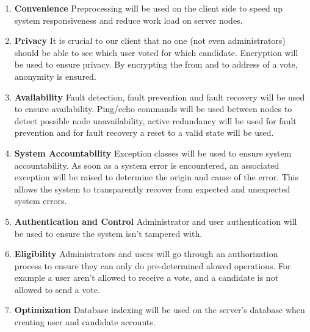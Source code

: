 \begin{enumerate}
		\item\textbf{Convenience}
		Preprocessing will be used on the client side to speed up system responsiveness and reduce work load on server nodes.
		
		\item\textbf{Privacy}
		It is crucial to our client that no one (not even administrators) should be able to see which user voted for which candidate. Encryption will be used to ensure privacy. By encrypting the from and to address of a vote, anonymity is ensured.
		
		\item\textbf{Availability}
		Fault detection, fault prevention and fault recovery will be used to ensure availability. Ping/echo commands will be used between nodes to detect possible node unavailability, active redundancy will be used for fault prevention and  for fault recovery a reset to a valid state will be used.
		
		\item\textbf{System Accountability}
		Exception classes will be used to ensure system accountability. As soon as a system error is encountered, an associated exception will be raised to determine the origin and cause of the error. This allows the system to transparently recover from expected and unexpected system errors.
		
		\item\textbf{Authentication and Control}
		Administrator and user authentication will be used to ensure the system isn't tampered with.
		
		\item\textbf{Eligibility}
		Administrators and users will go through an authorization process to ensure they can only do pre-determined alowed operations. For example a user aren't allowed to receive a vote, and a candidate is not allowed to send a vote.
		
		\item\textbf{Optimization}
		Database indexing will be used on the server's database when creating user and candidate accounts.
\end{enumerate}	